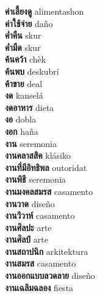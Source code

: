 \textbf{ ค่าเลี้ยงดู  } alimentashon \\
\textbf{ ค่าใช้จ่าย  } daño \\
\textbf{ ค่ำคืน  } skur \\
\textbf{ ค่ำมืด  } skur \\
\textbf{ ค้นคว้า  } chèk \\
\textbf{ ค้นพบ  } deskubrí \\
\textbf{ ค้าขาย  } deal \\
\textbf{ งด  } kanselá \\
\textbf{ งดอาหาร  } dieta \\
\textbf{ งอ  } dobla \\
\textbf{ งอก  } haña \\
\textbf{ งาน  } seremonia \\
\textbf{ งานคลาสสิค  } klásiko \\
\textbf{ งานที่มีอิทธิพล  } outoridat \\
\textbf{ งานพิธี  } seremonia \\
\textbf{ งานมงคลสมรส  } casamento \\
\textbf{ งานวาด  } diseño \\
\textbf{ งานวิวาห์  } casamento \\
\textbf{ งานศิลปะ  } arte \\
\textbf{ งานศิลป์  } arte \\
\textbf{ งานสถาปนิก  } arkitektura \\
\textbf{ งานสมรส  } casamento \\
\textbf{ งานออกแบบลวดลาย  } diseño \\
\textbf{ งานเฉลิมฉลอง  } fiesta \\
